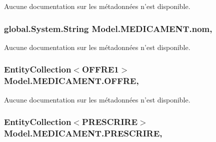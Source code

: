 Aucune documentation sur les métadonnées n'est disponible. 

\hypertarget{class_model_1_1_m_e_d_i_c_a_m_e_n_t_aac099e9240dac2de02bab20ac675d74b}{
\subsubsection[{nom}]{\setlength{\rightskip}{0pt plus 5cm}global.\-System.\-String Model.\-M\-E\-D\-I\-C\-A\-M\-E\-N\-T.\-nom\hspace{0.3cm}{\ttfamily [get]}, {\ttfamily [set]}}}\label{class_model_1_1_m_e_d_i_c_a_m_e_n_t_aac099e9240dac2de02bab20ac675d74b}


Aucune documentation sur les métadonnées n'est disponible. 

\hypertarget{class_model_1_1_m_e_d_i_c_a_m_e_n_t_a54e85fdea163abac71056ffc801917b5}{
\subsubsection[{O\-F\-F\-R\-E}]{\setlength{\rightskip}{0pt plus 5cm}Entity\-Collection$<${\bf O\-F\-F\-R\-E1}$>$ Model.\-M\-E\-D\-I\-C\-A\-M\-E\-N\-T.\-O\-F\-F\-R\-E\hspace{0.3cm}{\ttfamily [get]}, {\ttfamily [set]}}}\label{class_model_1_1_m_e_d_i_c_a_m_e_n_t_a54e85fdea163abac71056ffc801917b5}


Aucune documentation sur les métadonnées n'est disponible. 

\hypertarget{class_model_1_1_m_e_d_i_c_a_m_e_n_t_a88b07188c015f24de7f93837eeaa98b1}{
\subsubsection[{P\-R\-E\-S\-C\-R\-I\-R\-E}]{\setlength{\rightskip}{0pt plus 5cm}Entity\-Collection$<${\bf P\-R\-E\-S\-C\-R\-I\-R\-E}$>$ Model.\-M\-E\-D\-I\-C\-A\-M\-E\-N\-T.\-P\-R\-E\-S\-C\-R\-I\-R\-E\hspace{0.3cm}{\ttfamily [get]}, {\ttfamily [set]}}}\label{class_model_1_1_m_e_d_i_c_a_m_e_n_t_a88b07188c015f24de7f93837eeaa98b1}


